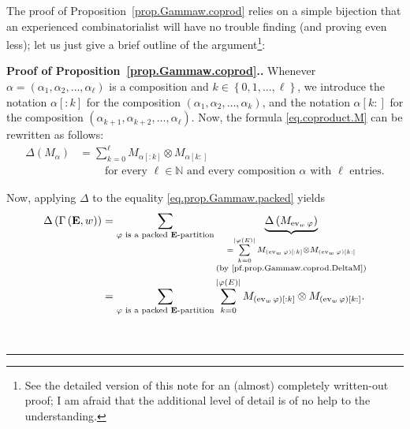 \documentclass[numbers=enddot,12pt,final,onecolumn,notitlepage,abstracton]{scrartcl}
\theoremstyle{definition}
\newenvironment{proof}[1][Proof]{\noindent\textbf{#1.} }{\ \rule{0.5em}{0.5em}}
\let\sumnonlimits\sum
\renewcommand{\sum}{\sumnonlimits\limits}
\newenvironment{vershort}{}{}
\newcommand{\ev}{\operatorname{ev}}
\newcommand{\EE}{{\mathbf{E}}}
\newcommand{\NN}{{\mathbb{N}}}
\begin{document}
\begin{vershort}
The proof of Proposition~\ref{prop.Gammaw.coprod} relies on
a simple bijection that an experienced combinatorialist will
have no trouble finding (and proving even less); let us just
give a brief outline of the argument\footnote{See the detailed
version of this note for an (almost) completely written-out
proof; I am afraid that the additional level of detail is of
no help to the understanding.}:

\begin{proof}[Proof of Proposition~\ref{prop.Gammaw.coprod}.]
Whenever
$\alpha = \left(\alpha_1, \alpha_2, \ldots, \alpha_\ell\right)$
is a composition and $k \in \left\{0, 1, \ldots, \ell\right\}$,
we introduce the notation
$\alpha\left[:k\right]$ for the composition
$\left(\alpha_1, \alpha_2, \ldots, \alpha_k\right)$, and the
notation $\alpha\left[k:\right]$ for the composition
$\left(\alpha_{k+1}, \alpha_{k+2}, \ldots, \alpha_\ell\right)$.
Now, the formula \eqref{eq.coproduct.M} can be rewritten as
follows:
\begin{align}
\label{pf.prop.Gammaw.coprod.DeltaM}
\Delta \left( M_\alpha \right)
&= \sum_{k=0}^{\ell} M_{\alpha\left[:k\right]}
\otimes M_{\alpha\left[k:\right]} \\
& \qquad \text{ for every } \ell \in \NN \text{ and every composition } \alpha
\text{ with } \ell \text{ entries.} \nonumber
\end{align}

Now, applying $\Delta$ to the equality
\eqref{eq.prop.Gammaw.packed} yields
\begin{align}
\Delta\left(\Gamma\left(\EE , w\right)\right)
&= \sum_{\varphi \text{ is a packed } \EE\text{-partition}}
\underbrace{\Delta\left(M_{\ev_w \varphi}\right)}_{
  \substack{ = \sum_{k=0}^{\left|\varphi\left(E\right)\right|}
  M_{\left(\ev_w \varphi\right)\left[:k\right]} \otimes
  M_{\left(\ev_w \varphi\right)\left[k:\right]} \\
  \text{(by \eqref{pf.prop.Gammaw.coprod.DeltaM})} }}
 \nonumber \\
&= \sum_{\varphi \text{ is a packed } \EE\text{-partition}}
\sum_{k=0}^{\left|\varphi\left(E\right)\right|}
M_{\left(\ev_w \varphi\right)\left[:k\right]} \otimes
M_{\left(\ev_w \varphi\right)\left[k:\right]} .
\label{pf.Gammaw.coprod.lhs}
\end{align}


\end{proof}
\end{vershort}
\end{document}

